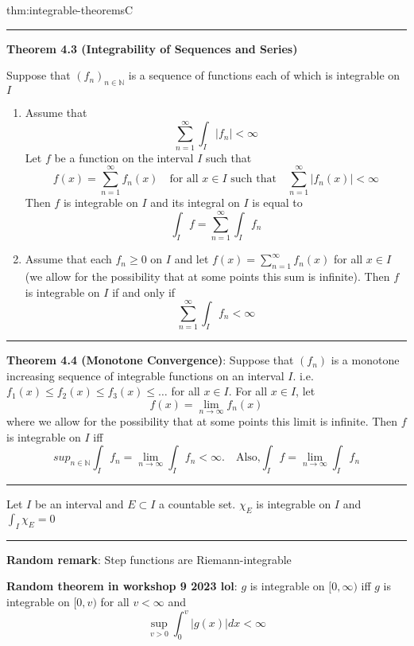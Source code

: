 \documentclass[landscape, 8pt]{extarticle}
\begin{document}
\begin{multicols}{3}
\begin{thm}{thm:integrable-theorems}{C}
	\vspace{-7pt}
	\noindent\rule{\textwidth}{0.2pt}
	\textbf{Theorem 4.3 (Integrability of Sequences and Series)}

	Suppose that $(f_{n})_{n\in\mathbb{N}}$ is a sequence of functions each of which is integrable on $I$
	\begin{enumerate}
		\setlength\itemsep{0em}
		\item Assume that
			\vspace{-5pt}
		\[\sum_{n=1}^{\infty} \int_{I} \lvert f_{n} \rvert <\infty\]
		Let $f$ be a function on the interval $I$ such that
		\[f(x)=\sum_{n=1}^{\infty} f_{n}(x)\quad\text{for all } x\in I\text{ such that}\quad \sum_{n=1}^{\infty} \lvert f_{n}(x) \rvert <\infty\]
		Then $f$ is integrable on $I$ and its integral on $I$ is equal to
		\[\int_{I} f=\sum_{n=1}^{\infty} \int_{I} f_{n}\]
		\item Assume that each $f_{n}\ge 0$ on $I$ and let $f(x)=\sum_{n=1}^{\infty}f_{n}(x)$ for all $x\in I$ (we allow for the possibility that at some points this sum is infinite). Then $f$ is integrable on $I$ if and only if
		\[\sum_{n=1}^{\infty} \int_{I} f_{n}<\infty\]
	\end{enumerate}

	\vspace{-5pt}
	\noindent\rule{\textwidth}{0.2pt}

	\textbf{Theorem 4.4 (Monotone Convergence)}: Suppose that $(f_{n})$ is a monotone increasing sequence of integrable functions on an interval $I$. i.e. $f_{1}(x) \le f_{2}(x) \le f_{3}(x) \le \dots$ for all $x\in I$. For all $x\in I$, let
	\[f(x) = \lim_{n\to \infty} f_{n}(x)\]
	where we allow for the possibility that at some points this limit is infinite. Then $f$ is integrable on $I$ iff
	\[sup_{n\in \mathbb{N}} \int_{I} f_{n} = \lim_{n\to \infty} \int_{I} f_{n} < \infty. \quad \text{Also,} \int_{I} f = \lim_{n\to \infty} \int_{I} f_{n}\]

	\noindent\rule{\textwidth}{0.2pt}

	Let $I$ be an interval and $E \subset I$ a countable set. $\chi_{E}$ is integrable on $I$ and $\int_{I}\chi_{E} = 0$

	\noindent\rule{\textwidth}{0.2pt}
	\textbf{Random remark}: Step functions are Riemann-integrable

	\textbf{Random theorem in workshop 9 2023 lol}: $g$ is integrable on $[0, \infty)$ iff $g$ is integrable on $[0, v)$ for all $v < \infty$ and
	\[\sup_{v > 0} \int_{0}^{v} \lvert g(x) \rvert dx < \infty\]
\end{thm}


\end{multicols}
\end{document}
